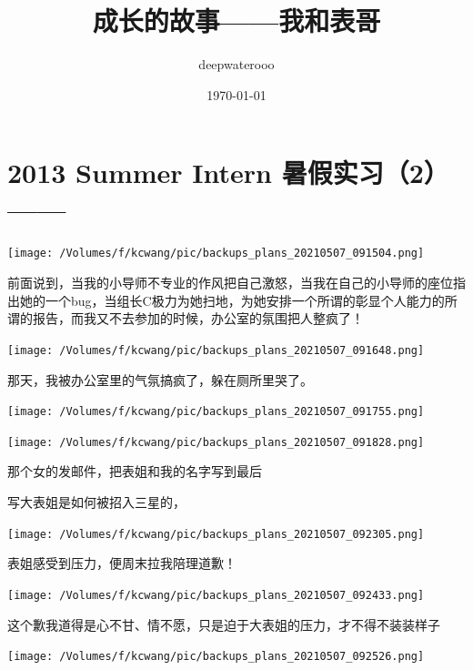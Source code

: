 \documentclass[9pt, b5paper]{article}
\author{deepwaterooo}
\date{\today}
\title{成长的故事——我和表哥}
\begin{document}
\maketitle
\tableofcontents


\section{2013 Summer Intern 暑假实习（2） ——}
\label{sec:orgee1c263}

\begin{center}
\texttt{[image: /Volumes/f/kcwang/pic/backups\_plans\_20210507\_091504.png]}
\end{center}

前面说到，当我的小导师不专业的作风把自己激怒，当我在自己的小导师的座位指出她的一个bug，当组长C极力为她扫地，为她安排一个所谓的彰显个人能力的所谓的报告，而我又不去参加的时候，办公室的氛围把人整疯了！

\begin{center}
\texttt{[image: /Volumes/f/kcwang/pic/backups\_plans\_20210507\_091648.png]}
\end{center}

那天，我被办公室里的气氛搞疯了，躲在厕所里哭了。 

\begin{center}
\texttt{[image: /Volumes/f/kcwang/pic/backups\_plans\_20210507\_091755.png]}
\end{center}

\begin{center}
\texttt{[image: /Volumes/f/kcwang/pic/backups\_plans\_20210507\_091828.png]}
\end{center}

那个女的发邮件，把表姐和我的名字写到最后

写大表姐是如何被招入三星的，

\begin{center}
\texttt{[image: /Volumes/f/kcwang/pic/backups\_plans\_20210507\_092305.png]}
\end{center}

表姐感受到压力，便周末拉我陪理道歉！

\begin{center}
\texttt{[image: /Volumes/f/kcwang/pic/backups\_plans\_20210507\_092433.png]}
\end{center}

这个歉我道得是心不甘、情不愿，只是迫于大表姐的压力，才不得不装装样子

\begin{center}
\texttt{[image: /Volumes/f/kcwang/pic/backups\_plans\_20210507\_092526.png]}
\end{center}
\end{document}
